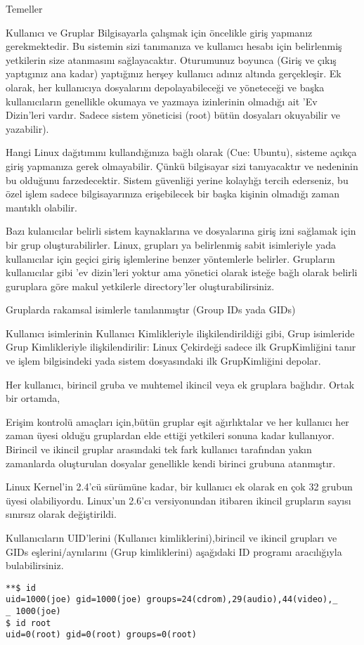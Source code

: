 \begin{section}{Temeller}
\begin{subsection}{Kullanıcı ve Gruplar}
Bilgisayarla çalışmak için öncelikle giriş yapmanız gerekmektedir. Bu sistemin sizi tanımanıza ve kullanıcı hesabı için belirlenmiş yetkilerin size atanmasını sağlayacaktır. Oturumunuz boyunca (Giriş ve çıkış yaptıgınız ana kadar) yaptığınız herşey kullanıcı adınız altında gerçekleşir. Ek olarak, her kullanıcıya dosyalarını depolayabileceği ve yöneteceği ve başka kullanıcıların genellikle okumaya ve yazmaya izinlerinin olmadığı ait 'Ev Dizin'leri vardır. Sadece sistem yöneticisi (root) bütün dosyaları okuyabilir ve yazabilir).

Hangi Linux dağıtımını kullandığınıza bağlı olarak (Cue: Ubuntu), sisteme açıkça giriş yapmanıza gerek olmayabilir. Çünkü bilgisayar sizi tanıyacaktır ve nedeninin bu olduğunu farzedecektir. Sistem güvenliği yerine kolaylığı tercih ederseniz, bu özel işlem sadece bilgisayarınıza erişebilecek bir başka kişinin olmadığı zaman mantıklı olabilir.

Bazı kulanıcılar belirli sistem kaynaklarına ve dosyalarına giriş izni sağlamak için bir grup oluşturabilirler. Linux, grupları ya belirlenmiş sabit isimleriyle yada kullanıcılar için geçici giriş işlemlerine benzer yöntemlerle belirler. Grupların kullanıcılar gibi 'ev dizin'leri yoktur ama yönetici olarak isteğe bağlı olarak belirli guruplara göre makul yetkilerle directory'ler oluşturabilirsiniz.

Gruplarda rakamsal isimlerle tanılanmıştır (Group IDs yada GIDs)

Kullanıcı isimlerinin Kullanıcı Kimlikleriyle ilişkilendirildiği gibi, Grup isimleride Grup Kimlikleriyle ilişkilendirilir: Linux Çekirdeği sadece ilk GrupKimliğini tanır ve işlem bilgisindeki yada sistem dosyasındaki ilk GrupKimliğini depolar.

Her kullanıcı, birincil gruba ve muhtemel ikincil veya ek gruplara bağlıdır. Ortak bir ortamda,

Erişim kontrolü amaçları için,bütün gruplar eşit ağırlıktalar ve her kullanıcı her zaman üyesi olduğu gruplardan elde ettiği yetkileri sonuna kadar kullanıyor. Birincil ve ikincil gruplar arasındaki tek fark kullanıcı tarafından yakın zamanlarda oluşturulan dosyalar genellikle kendi birinci grubuna atanmıştır.

Linux Kernel’in 2.4’cü sürümüne kadar, bir kullanıcı ek olarak en çok 32 grubun üyesi olabiliyordu. Linux’un 2.6’cı versiyonundan itibaren ikincil grupların sayısı sınırsız olarak değiştirildi.

Kullanıcıların UID’lerini (Kullanıcı kimliklerini),birincil ve ikincil grupları ve GIDs eşlerini/aynılarını (Grup kimliklerini) aşağıdaki ID programı aracılığıyla bulabilirsiniz.
\begin{verbatim}
**$ id
uid=1000(joe) gid=1000(joe) groups=24(cdrom),29(audio),44(video),_
_ 1000(joe)
$ id root
uid=0(root) gid=0(root) groups=0(root)
\end{verbatim}


\end{subsection}
\end{section}
